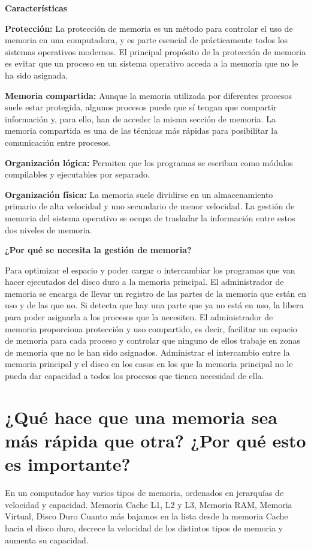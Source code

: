 \documentclass{article}
\begin{document}
\Large\textbf{Características}\newline

\normalsize\textbf{Protección:}
La protección de memoria es un método para controlar el uso de memoria en una computadora, y es parte esencial de prácticamente todos los sistemas operativos modernos. El principal propósito de la protección de memoria es evitar que un proceso en un sistema operativo acceda a la memoria que no le ha sido asignada.\newline

\textbf{Memoria compartida:}
Aunque la memoria utilizada por diferentes procesos suele estar protegida, algunos procesos puede que sí tengan que compartir información y, para ello, han de acceder la misma sección de memoria. La memoria compartida es una de las técnicas más rápidas para posibilitar la comunicación entre procesos.\newline

\textbf{Organización lógica:}
Permiten que los programas se escriban como módulos compilables y ejecutables por separado.\newline

\textbf{Organización física:}
La memoria suele dividirse en un almacenamiento primario de alta velocidad y uno secundario de menor velocidad.  La gestión de memoria del sistema operativo se ocupa de trasladar la información entre estos dos niveles de memoria.\newline

\textbf{¿Por qué se necesita la gestión de memoria?}\newline

Para optimizar el espacio y poder cargar o intercambiar los programas que van hacer ejecutados del disco duro a la memoria principal.\newline
El administrador de memoria se encarga de llevar un registro de las partes de la memoria que están en uso y de las que no. Si detecta que hay una parte que ya no está en uso, la libera para poder asignarla a los procesos que la necesiten.
El administrador de memoria proporciona protección y uso compartido, es decir, facilitar un espacio de memoria para cada proceso y controlar que ninguno de ellos trabaje en zonas de memoria que no le han sido asignados.\newline
Administrar el intercambio entre la memoria principal y el disco en los casos en los que la memoria principal no le pueda dar capacidad a todos los procesos que tienen necesidad de ella.\cite{Sistemas}

\section{¿Qué hace que una memoria sea más rápida que otra? ¿Por qué esto es importante?}

En un computador hay varios tipos de memoria, ordenados en jerarquías de velocidad y capacidad. Memoria Cache L1, L2 y L3, Memoria RAM, Memoria Virtual, Disco Duro Cuanto más bajamos en la lista desde la memoria Cache hacia el disco duro, decrece la velocidad de los distintos tipos de memoria y aumenta su capacidad.



\end{document}
